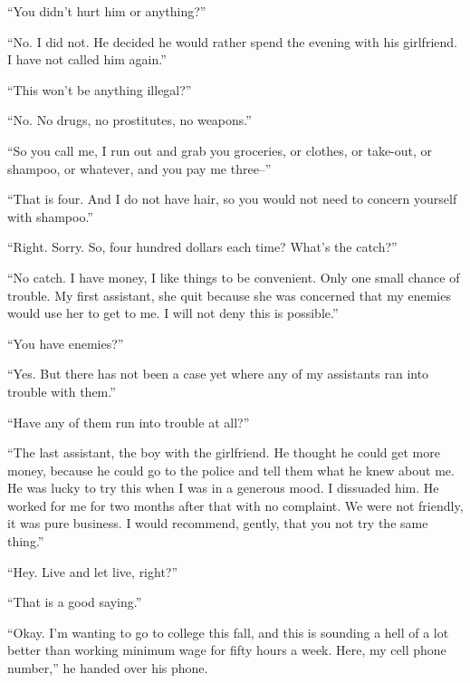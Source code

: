 ``You didn't hurt him or anything?''



``No.  I did not.  He decided he would rather spend the evening with his girlfriend.  I have not called him again.''



``This won't be anything illegal?''



``No.  No drugs, no prostitutes, no weapons.''



``So you call me, I run out and grab you groceries, or clothes, or take-out, or shampoo, or whatever, and you pay me three--''



``That is four.  And I do not have hair, so you would not need to concern yourself with shampoo.''



``Right.  Sorry.  So, four hundred dollars each time?  What's the catch?''



``No catch.  I have money, I like things to be convenient.  Only one small chance of trouble.  My first assistant, she quit because she was concerned that my enemies would use her to get to me.  I will not deny this is possible.''



``You have enemies?''



``Yes.  But there has not been a case yet where any of my assistants ran into trouble with them.''



``Have any of them run into trouble at all?''



``The last assistant, the boy with the girlfriend.  He thought he could get more money, because he could go to the police and tell them what he knew about me.  He was lucky to try this when I was in a generous mood.  I dissuaded him.  He worked for me for two months after that with no complaint.  We were not friendly, it was pure business.  I would recommend, gently, that you not try the same thing.''



``Hey.  Live and let live, right?''



``That is a good saying.''



``Okay.  I'm wanting to go to college this fall, and this is sounding a hell of a lot better than working minimum wage for fifty hours a week.  Here, my cell phone number,'' he handed over his phone.



